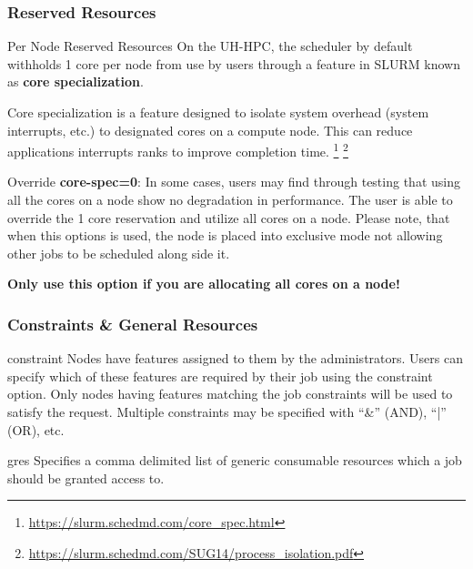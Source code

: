 \begin{frame}
\frametitle{Reserved Resources}

\begin{block}{Per Node Reserved Resources}\footnotesize
On the UH-HPC, the scheduler by default withholds 1 core per node from use by users through a feature in SLURM known as \textbf{core specialization}.
\end{block}
\begin{definition}\footnotesize
Core specialization is a feature designed to isolate system overhead (system interrupts, etc.) to designated cores on a compute node. This can reduce applications interrupts ranks to improve completion time. \footnote[1,frame]{\tiny \href{https://slurm.schedmd.com/core_spec.html}{https://slurm.schedmd.com/core\_spec.html}} \footnote[2,frame]{\tiny \href{https://slurm.schedmd.com/SUG14/process_isolation.pdf}{https://slurm.schedmd.com/SUG14/process\_isolation.pdf}}
\end{definition}
\begin{block}{Override}\footnotesize
\textbf{{\ddash}core-spec=0}: In some cases, users may find through testing that using all the cores on a node show no degradation in performance.  The user is able to override the 1 core reservation and utilize all cores on a node.  Please note, that when this options is used, the node is placed into exclusive mode not allowing other jobs to be scheduled along side it.\\
\begin{center}\textbf{\normalsize{Only use this option if you are allocating all cores on a node!}}\end{center}
\end{block}
\end{frame}

\begin{frame}
\frametitle{Constraints \&  General Resources}
\begin{block}{{\ddash}constraint} Nodes have features assigned to them by the administrators. Users can specify which of these features are required by their job using the constraint option. Only nodes having features matching the job constraints will be used to satisfy the request.  Multiple constraints may be specified with ``\&'' (AND), ``|'' (OR), etc.
\end{block}
\begin{block}{{\ddash}gres} Specifies a comma delimited list of generic consumable resources which a job should be granted access to. 
\end{block}
\end{frame}

